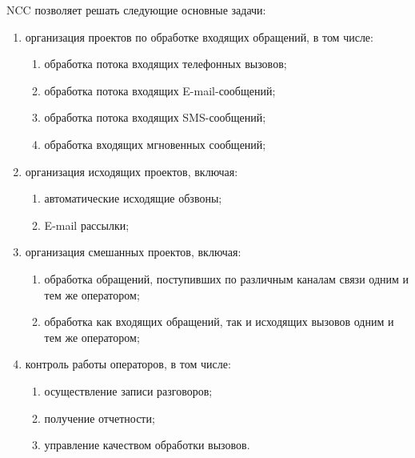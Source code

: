 NCC позволяет решать следующие основные задачи:
\begin{enumerate}
    \item организация проектов по обработке входящих обращений, в том числе:
    \begin{enumerate}
        \item обработка потока входящих телефонных вызовов;
        \item обработка потока входящих E-mail-сообщений;
        \item обработка потока входящих SMS-сообщений;
        \item обработка входящих мгновенных сообщений;
    \end{enumerate}
    \item организация исходящих проектов, включая:
    \begin{enumerate}
        \item автоматические исходящие обзвоны;
        \item E-mail рассылки;
    \end{enumerate}
    \item организация смешанных проектов, включая:
    \begin{enumerate}
        \item обработка обращений, поступивших по различным каналам связи одним и тем же оператором;
        \item обработка как входящих обращений, так и исходящих вызовов одним и тем же оператором;
    \end{enumerate}
    \item контроль работы операторов, в том числе:
    \begin{enumerate}
        \item осуществление записи разговоров;
        \item получение отчетности;
        \item управление качеством обработки вызовов.
    \end{enumerate}
\end{enumerate}

